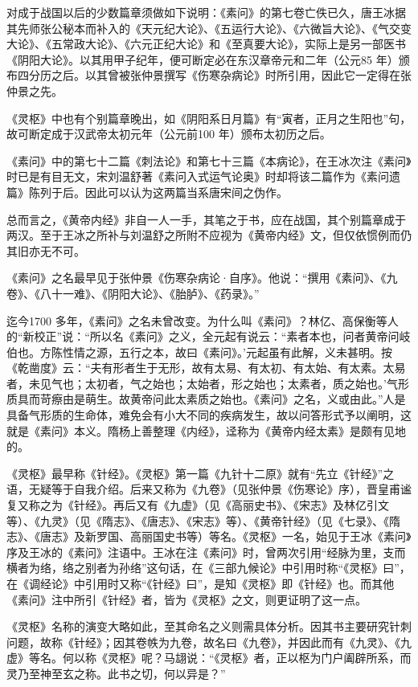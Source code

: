 \documentclass[a4paper,12pt,UTF8,twoside]{ctexbook}
\begin{document}
对成于战国以后的少数篇章须做如下说明：《素问》的第七卷亡佚已久，唐王冰据其先师张公秘本而补入的《天元纪大论》、《五运行大论》、《六微旨大论》、《气交变大论》、《五常政大论》、《六元正纪大论》和《至真要大论》，实际上是另一部医书《阴阳大论》。以其用甲子纪年，便可断定必在东汉章帝元和二年（公元85 年）颁布四分历之后。以其曾被张仲景撰写《伤寒杂病论》时所引用，因此它一定得在张仲景之先。

《灵枢》中也有个别篇章晚出，如《阴阳系日月篇》有“寅者，正月之生阳也”句，故可断定成于汉武帝太初元年（公元前100 年）颁布太初历之后。

《素问》中的第七十二篇《刺法论》和第七十三篇《本病论》，在王冰次注《素问》时已是有目无文，宋刘温舒著《素问入式运气论奥》时却将该二篇作为《素问遗篇》陈列于后。因此可以认为这两篇当系唐宋间之伪作。

总而言之，《黄帝内经》非自一人一手，其笔之于书，应在战国，其个别篇章成于两汉。至于王冰之所补与刘温舒之所附不应视为《黄帝内经》文，但仅依惯例而仍其旧亦无不可。

《素问》之名最早见于张仲景《伤寒杂病论·自序》。他说：“撰用《素问》、《九卷》、《八十一难》、《阴阳大论》、《胎胪》、《药录》。”

迄今1700 多年，《素问》之名未曾改变。为什么叫《素问》？林亿、高保衡等人的“新校正”说：“所以名《素问》之义，全元起有说云：“素者本也，问者黄帝问岐伯也。方陈性情之源，五行之本，故曰《素问》。’元起虽有此解，义未甚明。按《乾凿度》云：“夫有形者生于无形，故有太易、有太初、有太始、有太素。太易者，未见气也；太初者，气之始也；太始者，形之始也；太素者，质之始也。’气形质具而苛瘵由是萌生。故黄帝问此太素质之始也。《素问》之名，义或由此。”人是具备气形质的生命体，难免会有小大不同的疾病发生，故以问答形式予以阐明，这就是《素问》本义。隋杨上善整理《内经》，迳称为《黄帝内经太素》是颇有见地的。

《灵枢》最早称《针经》。《灵枢》第一篇《九针十二原》就有“先立《针经》”之语，无疑等于自我介绍。后来又称为《九卷》（见张仲景《伤寒论》序），晋皇甫谧复又称之为《针经》。再后又有《九虚》（见《高丽史书》、《宋志》及林亿引文等）、《九灵》（见《隋志》、《唐志》、《宋志》等）、《黄帝针经》（见《七录》、《隋志》、《唐志》及新罗国、高丽国史书等）等名。《灵枢》一名，始见于王冰《素问》序及王冰的《素问》注语中。王冰在注《素问》时，曾两次引用“经脉为里，支而横者为络，络之别者为孙络”这句话，在《三部九候论》中引用时称“《灵枢》曰”，在《调经论》中引用时又称“《针经》曰”，是知《灵枢》即《针经》也。而其他《素问》注中所引《针经》者，皆为《灵枢》之文，则更证明了这一点。

《灵枢》名称的演变大略如此，至其命名之义则需具体分析。因其书主要研究针刺问题，故称《针经》；因其卷帙为九卷，故名曰《九卷》，并因此而有《九灵》、《九虚》等名。何以称《灵枢》呢？马翃说：“《灵枢》者，正以枢为门户阖辟所系，而灵乃至神至玄之称。此书之切，何以异是？”
\end{document}
